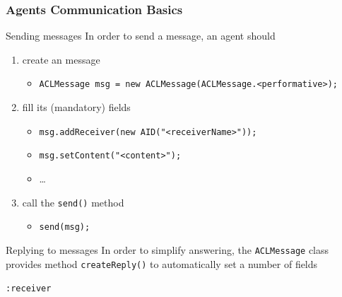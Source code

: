 \documentclass{beamer}\mode<presentation>{\usetheme{AMSCesenaPurpleAndGold}}
\begin{document}
\begin{frame}[c,allowframebreaks]\frametitle{Agents Communication Basics}
    \begin{block}{Sending messages}
        In order to send a message, an agent should
        \begin{enumerate}
            \item create an \acl{} message
            \begin{itemize}
                \item \footnotesize\texttt{ACLMessage msg = new ACLMessage(ACLMessage.\alert{<performative>});}
            \end{itemize}
            \item fill its (mandatory) fields
            \begin{itemize}
                \item \footnotesize\texttt{msg.addReceiver(new AID("<receiverName>"));}
                \item \footnotesize\texttt{msg.setContent("<content>");}
                \item \ldots
            \end{itemize}
            \item call the \texttt{send()} method
            \begin{itemize}
                \item \footnotesize\texttt{send(msg);}
            \end{itemize}
        \end{enumerate}
    \end{block}
    \begin{block}{Replying to messages}
        In order to simplify answering, the \texttt{ACLMessage} class provides method \texttt{createReply()} to automatically set a number of \acl{} fields
        \begin{itemize}\begin{small}
                \item \texttt{:receiver}

\end{small}
\end{itemize}
\end{block}
\end{frame}
\end{document}
